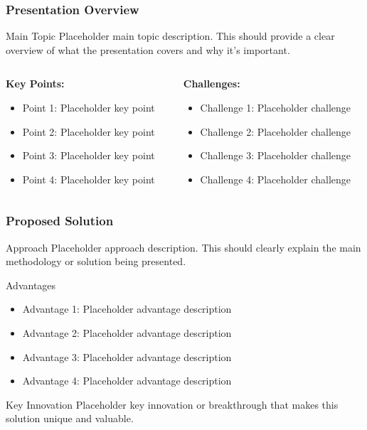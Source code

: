 \begin{frame}
\frametitle{Presentation Overview}
\begin{block}{Main Topic}
Placeholder main topic description. This should provide a clear overview of what the presentation covers and why it's important.
\end{block}

\begin{columns}
\begin{column}{0.5\textwidth}
\textbf{Key Points:}
\begin{itemize}
\item \textcolor{myblue}{Point 1:} Placeholder key point
\item \textcolor{mygreen}{Point 2:} Placeholder key point
\item \textcolor{mypurple}{Point 3:} Placeholder key point
\item \textcolor{myorange}{Point 4:} Placeholder key point
\end{itemize}
\end{column}
\begin{column}{0.5\textwidth}
\textbf{Challenges:}
\begin{itemize}
\item \textcolor{myred}{Challenge 1:} Placeholder challenge
\item \textcolor{myred}{Challenge 2:} Placeholder challenge
\item \textcolor{myred}{Challenge 3:} Placeholder challenge
\item \textcolor{myred}{Challenge 4:} Placeholder challenge
\end{itemize}
\end{column}
\end{columns}
\end{frame}

\begin{frame}
\frametitle{Proposed Solution}
\begin{block}{Approach}
Placeholder approach description. This should clearly explain the main methodology or solution being presented.
\end{block}

\begin{block}{Advantages}
\begin{itemize}
\item \textcolor{mygreen}{Advantage 1:} Placeholder advantage description
\item \textcolor{mygreen}{Advantage 2:} Placeholder advantage description
\item \textcolor{mygreen}{Advantage 3:} Placeholder advantage description
\item \textcolor{mygreen}{Advantage 4:} Placeholder advantage description
\end{itemize}
\end{block}

\begin{alertblock}{Key Innovation}
Placeholder key innovation or breakthrough that makes this solution unique and valuable.
\end{alertblock}
\end{frame}

